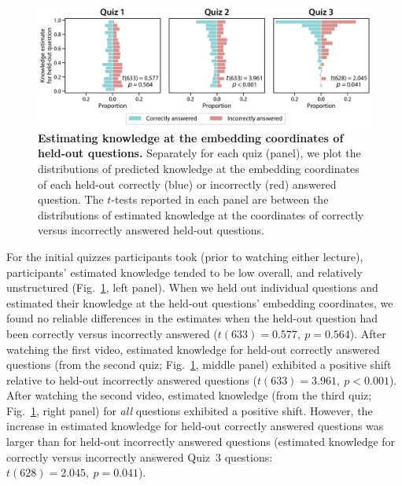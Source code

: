\documentclass[10pt]{article}
\begin{document}
\begin{figure}[tp]
    \centering
    \includegraphics[width=\textwidth]{figs/held-out-question-analysis}

    \caption{\textbf{Estimating knowledge at the embedding coordinates of
    held-out questions.} Separately for each quiz (panel), we plot the
    distributions of predicted knowledge at the embedding coordinates of each
    held-out correctly (blue) or incorrectly (red) answered question. The
    $t$-tests reported in each panel are between the distributions of estimated
    knowledge at the coordinates of correctly versus incorrectly answered
    held-out questions.}

    \label{fig:predictions}
\end{figure}

For the initial quizzes participants took (prior to watching either lecture),
participants' estimated knowledge tended to be low overall, and relatively
unstructured (Fig.~\ref{fig:predictions}, left panel). When we held out
individual questions and estimated their knowledge at the held-out questions'
embedding coordinates, we found no reliable differences in the estimates when
the held-out question had been correctly versus incorrectly answered ($t(633) =
0.577,~p = 0.564$). After watching the first video, estimated knowledge for
held-out correctly answered questions (from the second quiz;
Fig.~\ref{fig:predictions}, middle panel) exhibited a positive shift relative
to held-out incorrectly answered questions ($t(633) = 3.961,~p < 0.001$). After
watching the second video, estimated knowledge (from the third quiz;
Fig.~\ref{fig:predictions}, right panel) for \textit{all} questions exhibited a
positive shift. However, the increase in estimated knowledge for held-out
correctly answered questions was larger than for held-out incorrectly answered
questions (estimated knowledge for correctly versus incorrectly answered 
Quiz~3 questions: $t(628) = 2.045,~p = 0.041$).
\end{document}
